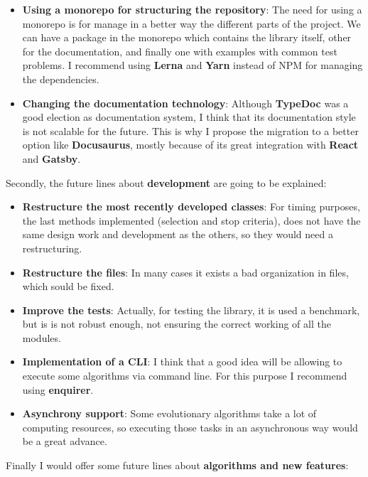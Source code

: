 \begin{itemize}
    \item \textbf{Using a monorepo for structuring the repository}: The need for using a monorepo is for manage in a better way the different parts of the project. We can have a package in the monorepo which contains the library itself, other for the documentation, and finally one with examples with common test problems. I recommend using \textbf{Lerna} and \textbf{Yarn} instead of NPM for managing the dependencies.
    \item \textbf{Changing the documentation technology}: Although \textbf{TypeDoc} was a good election as documentation system, I think that its documentation style is not scalable for the future. This is why I propose the migration to a better option like \textbf{Docusaurus}, mostly because of its great integration with \textbf{React} and \textbf{Gatsby}.
\end{itemize}

Secondly, the future lines about \textbf{development} are going to be explained:

\begin{itemize}
    \item \textbf{Restructure the most recently developed classes}: For timing purposes, the last methods implemented (selection and stop criteria), does not have the same design work and development as the others, so they would need a restructuring.
    \item \textbf{Restructure the files}: In many cases it exists a bad organization in files, which sould be fixed.
    \item \textbf{Improve the tests}: Actually, for testing the library, it is used a benchmark, but is is not robust enough, not ensuring the correct working of all the modules.
    \item \textbf{Implementation of a CLI}: I think that a good idea will be allowing to execute some algorithms via command line. For this purpose I recommend using \textbf{enquirer}.
    \item \textbf{Asynchrony support}: Some evolutionary algorithms take a lot of computing resources, so executing those tasks in an asynchronous way would be a great advance.
\end{itemize}

Finally I would offer some future lines about \textbf{algorithms and new features}:

